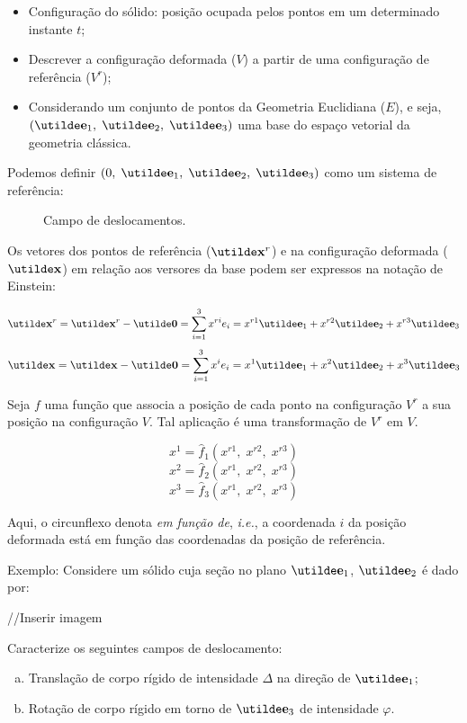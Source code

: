 \begin{itemize}
	\item Configuração do sólido: posição ocupada pelos pontos em um determinado instante $t$;
	\item Descrever a configuração deformada ($V$) a partir de uma configuração de referência ($V^r$);
	\item \sloppy Considerando um conjunto de pontos da Geometria Euclidiana ($E$), e seja, $(\vt{e}_1,\;\vt{e}_2,\;\vt{e}_3)$ uma base do espaço vetorial da geometria clássica.
\end{itemize}
	
Podemos definir $(0,\;\vt{e}_1,\;\vt{e}_2,\;\vt{e}_3)$ como um sistema de referência:

\begin{figure}[H]
	\centering
	\caption{Campo de deslocamentos.}
	
\end{figure}
	
Os vetores dos pontos de referência ($\vt{x}^r$) e na configuração deformada ($\vt{x}$) em relação aos versores da base podem ser expressos na notação de Einstein:

\[\vt{x}^r=\vt{x}^r-\vt{0}=\sum_{i=1}^3x^{ri}e_i=x^{r1}\vt{e}_1+x^{r2}\vt{e}_2+x^{r3}\vt{e}_3\]
\[\vt{x}=\vt{x}-\vt{0}=\sum_{i=1}^3x^ie_i=x^1\vt{e}_1+x^2\vt{e}_2+x^3\vt{e}_3\]

Seja $f$ uma função que associa a posição de cada ponto na configuração $V^r$ a sua posição na configuração $V$. Tal aplicação é uma transformação de $V^r$ em $V$.
	
\[x^1=\hat{f}_1(x^{r1},\;x^{r2},\;x^{r3})\]
\[x^2=\hat{f}_2(x^{r1},\;x^{r2},\;x^{r3})\]
\[x^3=\hat{f}_3(x^{r1},\;x^{r2},\;x^{r3})\]

Aqui, o circunflexo denota \textit{em função de}, \textit{i.e.}, a coordenada $i$ da posição deformada está em função das coordenadas da posição de referência.
	
Exemplo: Considere um sólido cuja seção no plano $\vt{e}_1$, $\vt{e}_2$ é dado por:
	
//Inserir imagem
	
Caracterize os seguintes campos de deslocamento:
	
\begin{enumerate}[a)]
	\item Translação de corpo rígido de intensidade $\Delta$ na direção de $\vt{e}_1$;
	\item Rotação de corpo rígido em torno de $\vt{e}_3$ de intensidade $\varphi$.
\end{enumerate}
	

